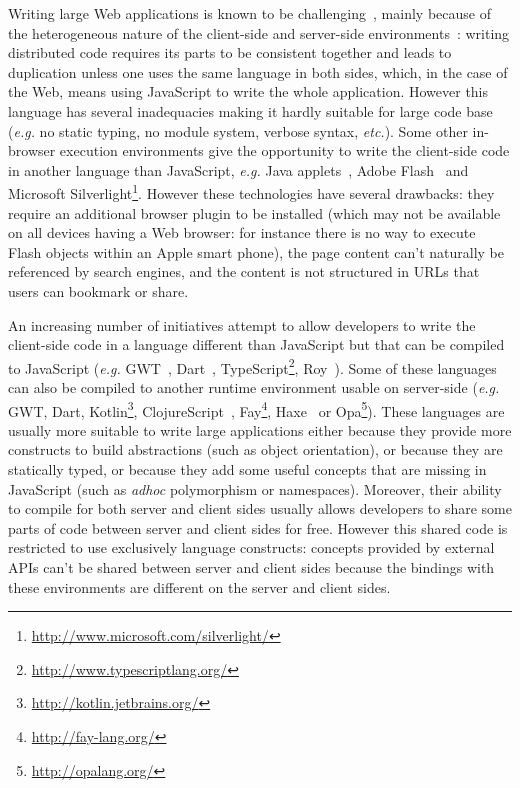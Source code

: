 \documentclass[american,english,runningheads]{llncs}
\newcommand{\eg}{\emph{e.g.}}
\newcommand{\etc}{\emph{etc.}}
\begin{document}
Writing large Web applications is known to be
challenging~\cite{Mikkonen08_SpaghettiJs,Preciado05_RIAMethodologyNecessity}, mainly because of the heterogeneous
nature of the client-side and server-side environments~\cite{Echeverria09_RIA,Kuuskeri09_PartitioningClientServer}:
writing distributed code requires its parts to be consistent together and leads to duplication unless one uses the
same language in both sides, which, in the case of the Web, means using JavaScript to write the whole application.
However this language has several inadequacies making it hardly suitable for large code base (\eg{} no static typing,
no module system, verbose syntax, \etc). Some other in-browser execution environments give the opportunity to write
the client-side code in another language than JavaScript, \eg{} Java applets~\cite{Anuff96_JavaApplets}, Adobe
Flash~\cite{Curtis00_Flash} and Microsoft
Silverlight\footnote{\href{http://www.microsoft.com/silverlight/}{http://www.microsoft.com/silverlight/}}. However
these technologies have several drawbacks: they require an additional browser plugin to be installed (which may not
be available on all devices having a Web browser: for instance there is no way to execute Flash objects within an
Apple smart phone), the page content can't naturally be referenced by search engines, and the content is not
structured in URLs that users can bookmark or share.

An increasing number of initiatives attempt to allow developers to write the client-side code in a language different
than JavaScript but that can be compiled to JavaScript (\eg{} GWT~\cite{Chaganti07_GWT}, Dart~\cite{Griffith11_Dart},
TypeScript\footnote{\href{http://www.typescriptlang.org/}{http://www.typescriptlang.org/}}, Roy~\cite{McKenna_Roy}).
Some of these languages can also be compiled to another runtime environment usable on server-side (\eg{} GWT, Dart,
Kotlin\footnote{\href{http://kotlin.jetbrains.org/}{http://kotlin.jetbrains.org/}},
ClojureScript~\cite{McGranaghan11_ClojureScript}, Fay\footnote{\href{http://fay-lang.org/}{http://fay-lang.org/}},
Haxe~\cite{Cannasse08_HaXe} or Opa\footnote{\href{http://opalang.org/}{http://opalang.org/}}). These languages are
usually more suitable to write large applications either because they provide more constructs to build abstractions
(such as object orientation), or because they are statically typed, or because they add some useful concepts
that are missing in JavaScript (such as \emph{adhoc} polymorphism or namespaces). Moreover, their ability to compile
for both server and client sides usually allows developers to share some parts of code between server and client
sides for free. However this shared code is restricted to use exclusively language constructs: concepts provided by
external APIs can't be shared between server and client sides because the bindings with these environments are
different on the server and client sides.
\end{document}
